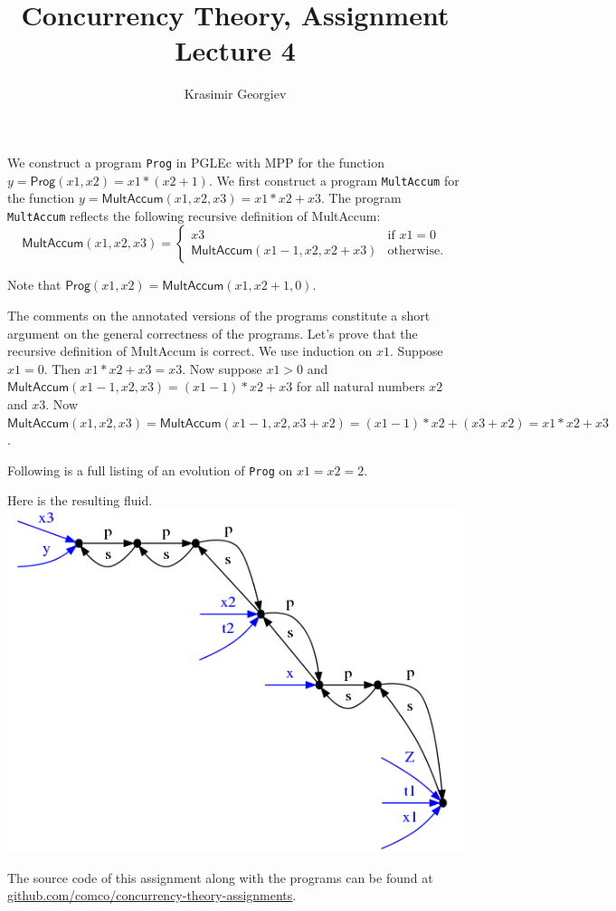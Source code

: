 \documentclass[a4paper]{article}
\title{Concurrency Theory, Assignment Lecture 4}
\author{Krasimir Georgiev}
\newcommand{\prog}[1]{\texttt{#1}}
\newcommand{\pfun}[1]{\textsf{#1}}
\begin{document}
\maketitle

We construct a program \prog{Prog} in PGLEc with MPP for the function
$y = \pfun{Prog}(x1, x2) = x1 * (x2 + 1)$.
We first construct a program \prog{MultAccum} for the function $y =
\pfun{MultAccum}(x1, x2, x3) = x1 * x2 + x3$.
The program \prog{MultAccum} reflects the following recursive definition of
\pfun{MultAccum}:
\[
\pfun{MultAccum}(x1, x2, x3) =
\begin{cases}
    x3 & \mbox{if } x1 = 0 \\
    \pfun{MultAccum}(x1 - 1, x2, x2 + x3) & \mbox{otherwise.}
\end{cases}
\]


\newpage
Note that $\pfun{Prog}(x1, x2) = \pfun{MultAccum}(x1, x2 + 1, 0)$.

The comments on the annotated versions of the programs constitute a short
argument on the general correctness of the programs. Let's prove that the
recursive definition of \pfun{MultAccum} is correct. We use induction on $x1$.
Suppose $x1 = 0$. Then $x1*x2 + x3 = x3$.
Now suppose $x1 > 0$ and $\pfun{MultAccum}(x1 - 1, x2, x3) = (x1 - 1)*x2 + x3$
for all natural numbers $x2$ and $x3$.
Now $\pfun{MultAccum}(x1, x2, x3) = \pfun{MultAccum}(x1 - 1, x2, x3 + x2) =
(x1 - 1)*x2 + (x3 + x2) = x1*x2 + x3$.

Following is a full listing of an evolution of \prog{Prog} on $x1=x2=2$.


Here is the resulting fluid.
\includegraphics[scale=0.5]{fluid_2_2.png}

The source code of this assignment along with the programs can be found at
\url{github.com/comco/concurrency-theory-assignments}.
\end{document}
